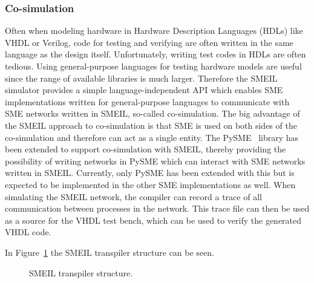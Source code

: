 \subsubsection{Co-simulation}
Often when modeling hardware in Hardware Description Languages (HDLs) like VHDL or Verilog, code for testing and verifying are often written in the same language as the design itself. Unfortunately, writing test codes in HDLs are often tedious. Using general-purpose languages for testing hardware models are useful since the range of available libraries is much larger.
Therefore the SMEIL simulator provides a simple language-independent API which enables SME implementations written for general-purpose languages to communicate with SME networks written in SMEIL, so-called co-simulation.
The big advantage of the SMEIL approach to co-simulation is that SME is used on both sides of the co-simulation and therefore can act as a single entity.
The PySME~\cite{pysme} library has been extended to support co-simulation with SMEIL, thereby providing the possibility of writing networks in PySME which can interact with SME networks written in SMEIL. Currently, only PySME has been extended with this but is expected to be implemented in the other SME implementations as well.
When simulating the SMEIL network, the compiler can record a trace of all communication between processes in the network. This trace file can then be used as a source for the VHDL test bench, which can be used to verify the generated VHDL code.

In Figure~\ref{fig:smeil_transpiler} the SMEIL transpiler structure can be seen.

\begin{figure}[!ht]
  \centering
  \caption{SMEIL transpiler structure.}
  \label{fig:smeil_transpiler}
\end{figure}
